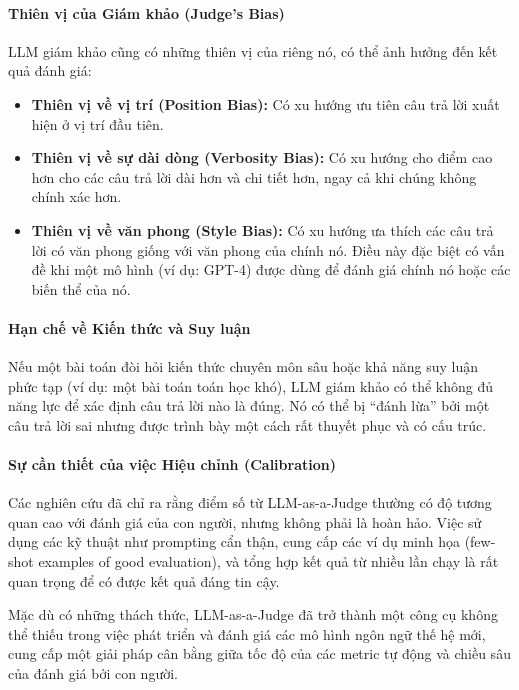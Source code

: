 \paragraph{Thiên vị của Giám khảo (Judge's Bias)}
LLM giám khảo cũng có những thiên vị của riêng nó, có thể ảnh hưởng đến kết quả đánh giá:
\begin{itemize}
    \item \textbf{Thiên vị về vị trí (Position Bias):} Có xu hướng ưu tiên câu trả lời xuất hiện ở vị trí đầu tiên.
    \item \textbf{Thiên vị về sự dài dòng (Verbosity Bias):} Có xu hướng cho điểm cao hơn cho các câu trả lời dài hơn và chi tiết hơn, ngay cả khi chúng không chính xác hơn.
    \item \textbf{Thiên vị về văn phong (Style Bias):} Có xu hướng ưa thích các câu trả lời có văn phong giống với văn phong của chính nó. Điều này đặc biệt có vấn đề khi một mô hình (ví dụ: GPT-4) được dùng để đánh giá chính nó hoặc các biến thể của nó.
\end{itemize}

\paragraph{Hạn chế về Kiến thức và Suy luận}
Nếu một bài toán đòi hỏi kiến thức chuyên môn sâu hoặc khả năng suy luận phức tạp (ví dụ: một bài toán toán học khó), LLM giám khảo có thể không đủ năng lực để xác định câu trả lời nào là đúng. Nó có thể bị “đánh lừa” bởi một câu trả lời sai nhưng được trình bày một cách rất thuyết phục và có cấu trúc.

\paragraph{Sự cần thiết của việc Hiệu chỉnh (Calibration)}
Các nghiên cứu đã chỉ ra rằng điểm số từ LLM-as-a-Judge thường có độ tương quan cao với đánh giá của con người, nhưng không phải là hoàn hảo. Việc sử dụng các kỹ thuật như prompting cẩn thận, cung cấp các ví dụ minh họa (few-shot examples of good evaluation), và tổng hợp kết quả từ nhiều lần chạy là rất quan trọng để có được kết quả đáng tin cậy.

Mặc dù có những thách thức, LLM-as-a-Judge đã trở thành một công cụ không thể thiếu trong việc phát triển và đánh giá các mô hình ngôn ngữ thế hệ mới, cung cấp một giải pháp cân bằng giữa tốc độ của các metric tự động và chiều sâu của đánh giá bởi con người.

